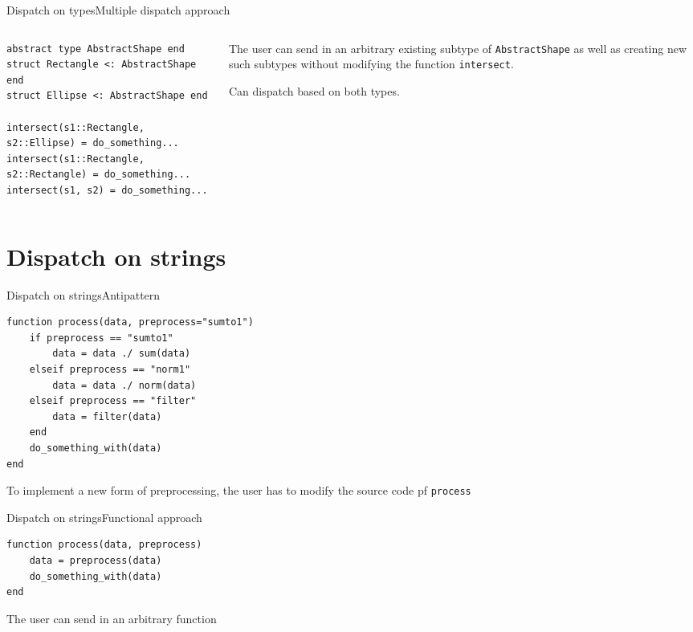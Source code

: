\begin{frame}[fragile]{Dispatch on types}{Multiple dispatch approach}
    \begin{columns}
 	\begin{column}{0.8\textwidth}

\begin{verbatim}
abstract type AbstractShape end
struct Rectangle <: AbstractShape end
struct Ellipse <: AbstractShape end

intersect(s1::Rectangle, s2::Ellipse) = do_something...
intersect(s1::Rectangle, s2::Rectangle) = do_something...
intersect(s1, s2) = do_something...
\end{verbatim}
\end{column}
\hspace{-5mm}
\begin{column}{0.3\textwidth}
     The user can send in an arbitrary existing subtype of
    \texttt{AbstractShape} as well as creating new such
    subtypes without modifying the function \texttt{intersect}.

    \vspace{3mm}
    Can dispatch based on both types.
\end{column}
\end{columns}


\end{frame}


\section{Dispatch on strings}\label{dispatch-on-strings}

\begin{frame}[fragile]{Dispatch on strings}{Antipattern}

\begin{verbatim}
function process(data, preprocess="sumto1")
    if preprocess == "sumto1"
        data = data ./ sum(data)
    elseif preprocess == "norm1"
        data = data ./ norm(data)
    elseif preprocess == "filter"
        data = filter(data)
    end
    do_something_with(data)
end
\end{verbatim}

 To implement a new form of preprocessing, the user has to
modify the source code pf \texttt{process}

\end{frame}

\begin{frame}[fragile]{Dispatch on strings}{Functional approach}

\begin{verbatim}
function process(data, preprocess)
    data = preprocess(data)
    do_something_with(data)
end
\end{verbatim}

 The user can send in an arbitrary function

\end{frame}

